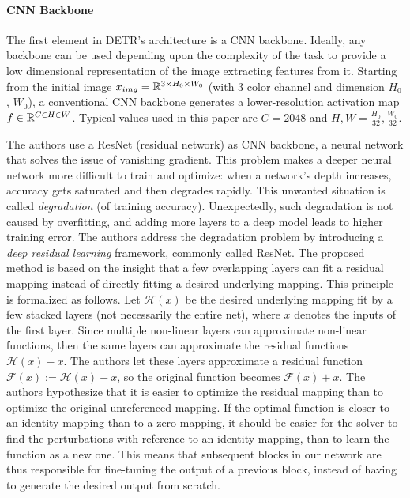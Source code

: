\paragraph{CNN Backbone} The first element in DETR's architecture is a CNN backbone.  Ideally, any backbone can be used depending upon the complexity of the task to provide a low dimensional representation of the image extracting features from it. Starting from the initial image $x_{img} = \mathbb{R}^{3\times H_0\times W_0}$ (with 3 color channel and dimension $H_0$, $W_0$), a conventional CNN backbone generates a lower-resolution activation map $f \in \mathbb{R}^{C \in H \in W}$. Typical values used in this paper are $C = 2048$ and $H, W = \frac{H_0}{32}, \frac{W_0}{32}$. 

The authors use a ResNet (residual network) \cite{resnet} as CNN backbone, a neural network that solves the issue of vanishing gradient. This problem makes a deeper neural network more difficult to train and optimize: when a network's depth increases, accuracy gets saturated and then degrades rapidly. This unwanted situation is called \textit{degradation} (of training accuracy). Unexpectedly, such degradation is not caused by overfitting, and adding
more layers to a deep model leads to higher training error. The authors address the degradation problem by introducing a \textit{deep residual learning} framework, commonly called ResNet. The proposed method is based on the insight that a few overlapping layers can fit a residual mapping instead of directly fitting a desired underlying mapping. This principle is formalized as follows. Let $\mathcal{H}(x)$ be the desired underlying mapping fit by a few stacked layers (not necessarily the entire net), where $x$ denotes the inputs of the first layer. Since multiple non-linear layers can approximate non-linear functions, then  the same layers can approximate the residual functions $\mathcal{H}(x) - x$. The authors let these layers approximate a residual function
$\mathcal{F}(x) := \mathcal{H}(x) - x$, so the original function becomes
$\mathcal{F}(x)+x$. The authors hypothesize that it is easier to optimize the residual mapping than to optimize the original unreferenced mapping.  If the optimal function is closer to an identity
mapping than to a zero mapping, it should be easier for the
solver to find the perturbations with reference to an identity
mapping, than to learn the function as a new one. This means that subsequent blocks in our network are thus responsible for fine-tuning the output of a previous block, instead of having to generate the desired output from scratch.


